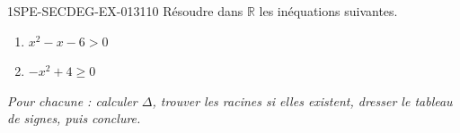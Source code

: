 \begin{exercice}{1SPE-SECDEG-EX-013}{1}{10}
Résoudre dans $\mathbb{R}$ les inéquations suivantes.

\begin{enumerate}
  \item $x^2 - x - 6 > 0$
  \item $-x^2 + 4 \geqslant 0$
\end{enumerate}

\textit{Pour chacune : calculer $\Delta$, trouver les racines si elles existent, dresser le tableau de signes, puis conclure.}
\end{exercice}
